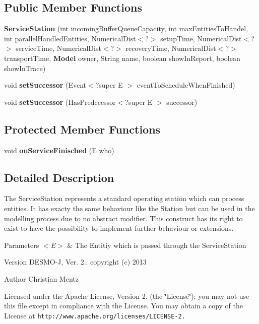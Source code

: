 \subsection*{Public Member Functions}
\begin{DoxyCompactItemize}
\item 
{\bf Service\-Station} (int incoming\-Buffer\-Queue\-Capacity, int max\-Entities\-To\-Handel, int parallel\-Handled\-Entities, Numerical\-Dist$<$?$>$ setup\-Time, Numerical\-Dist$<$?$>$ service\-Time, Numerical\-Dist$<$?$>$ recovery\-Time, Numerical\-Dist$<$?$>$ transport\-Time, {\bf Model} owner, String name, boolean show\-In\-Report, boolean show\-In\-Trace)
\item 
void {\bfseries set\-Successor} (Event$<$?super E $>$ event\-To\-Schedule\-When\-Finished)\label{classdesmoj_1_1extensions_1_1chaining_1_1_service_station_3_01_e_01extends_01_entity_01_4_ad0f665de89e4ea5ee644b5788bbdaa68}

\item 
void {\bfseries set\-Successor} (Has\-Predecessor$<$?super E $>$ successor)\label{classdesmoj_1_1extensions_1_1chaining_1_1_service_station_3_01_e_01extends_01_entity_01_4_a5ff563534ac06efcd8f378e0ab70993f}

\end{DoxyCompactItemize}
\subsection*{Protected Member Functions}
\begin{DoxyCompactItemize}
\item 
void {\bf on\-Service\-Finisched} (E who)
\end{DoxyCompactItemize}


\subsection{Detailed Description}
The Service\-Station represents a standard operating station which can process entities. It has exacty the same behaviour like the Station but can be used in the modelling process due to no abstract modifier. This construct has its right to exist to have the possibility to implement further behaviour or extensions.


\begin{DoxyParams}{Parameters}
{\em $<$\-E$>$} & The Entitiy which is passed through the Service\-Station\\
\hline
\end{DoxyParams}
\begin{DoxyVersion}{Version}
D\-E\-S\-M\-O-\/\-J, Ver. 2.. copyright (c) 2013 
\end{DoxyVersion}
\begin{DoxyAuthor}{Author}
Christian Mentz
\end{DoxyAuthor}
Licensed under the Apache License, Version 2. (the \char`\"{}\-License\char`\"{}); you may not use this file except in compliance with the License. You may obtain a copy of the License at {\tt http\-://www.\-apache.\-org/licenses/\-L\-I\-C\-E\-N\-S\-E-\/2.}

